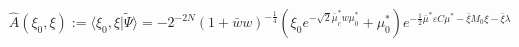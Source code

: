 \begin{equation}
\hat{A}(\xi _{0},\xi ):=\langle \xi _{0},\xi |\tilde{\Psi}\rangle
=-2^{-2N}(1+\bar{w}w)^{-{\frac{1}{4}}}(\xi _{0}e^{-\sqrt{2}\bar{\mu}
_{c}^{\ast }w\mu _{0}^{\ast }}+\mu _{0}^{\ast })e^{-{\frac{1}{2}}\bar{\mu}
^{\ast }\varepsilon C\mu ^{\ast }-\bar{\xi}M_0\xi 
-\bar{\xi}\lambda }
\end{equation}

